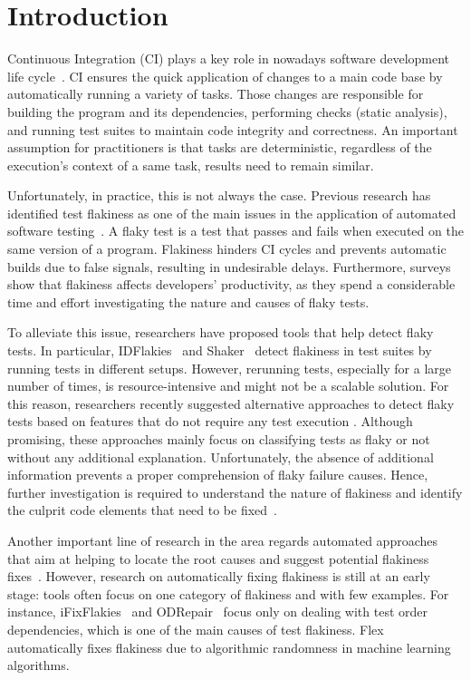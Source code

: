 \section{Introduction}
\label{sec:flakycat-introduction}

Continuous Integration (CI) plays a key role in nowadays software development life cycle~\cite{shahin2017continuous, CI}. 
CI ensures the quick application of changes to a main code base by automatically running a variety of tasks. Those changes are responsible for building the program and its dependencies, performing checks (\eg static analysis), and running test suites to maintain code integrity and correctness. An important assumption for practitioners is that tasks are deterministic, \ie regardless of the execution's context of a same task, results need to remain similar. 

Unfortunately, in practice, this is not always the case. Previous research has identified test flakiness as one of the main issues in the application of automated software testing~\cite{Micco2017,LeongSPTM19, memon2017taming}. A flaky test is a test that passes and fails when executed on the same version of a program. Flakiness hinders CI cycles and prevents automatic builds due to false signals, resulting in undesirable delays. Furthermore, surveys~\cite{habchi2021qualitative, Eck2019, gruber2022survey} show that flakiness affects developers' productivity, as they spend a considerable time and effort investigating the nature and causes of flaky tests. 

To alleviate this issue, researchers have proposed tools that help detect flaky tests. In particular, IDFlakies~\cite{Lam2019iDFlakies} and Shaker~\cite{Silva2020} detect flakiness in test suites by running tests in different setups. However, rerunning tests, especially for a large number of times, is resource-intensive and might not be a scalable solution. For this reason, researchers recently suggested alternative approaches to detect flaky tests based on features that do not require any test execution \cite{LeongSPTM19,King2018,pinto2020vocabulary,camara2021use}. Although promising, these approaches mainly focus on classifying tests as flaky or not without any additional explanation. Unfortunately, the absence of additional information prevents a proper comprehension of flaky failure causes. Hence, further investigation is required to understand the nature of flakiness and identify the culprit code elements that need to be fixed~\cite{Eck2019}.

Another important line of research in the area regards automated approaches that aim at helping to locate the root causes and suggest potential flakiness fixes~\cite{De-Flake,Lam2019RootCausing,flakyloc}. However, research on automatically fixing flakiness is still at an early stage: tools often focus on one category of flakiness and with few examples. For instance, iFixFlakies~\cite{Shi2019iFix} and ODRepair~\cite{li2022repairing} focus only on dealing with test order dependencies, which is one of the main causes of test flakiness. Flex~\cite{Dutta2020} automatically fixes flakiness due to algorithmic randomness in machine learning algorithms. 

